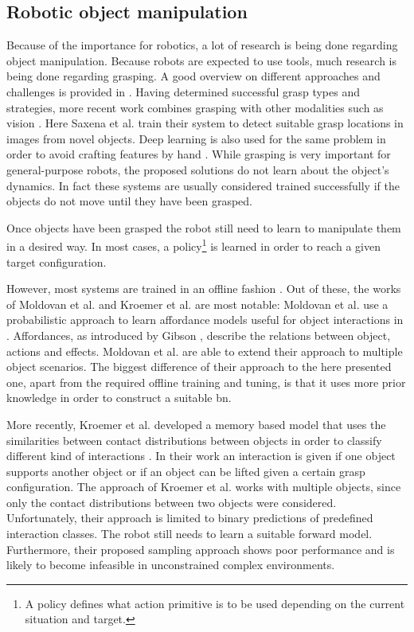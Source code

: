 \subsection{Robotic object manipulation}

Because of the importance for robotics, a lot of research is being done regarding object manipulation. Because robots are expected to use tools, much research is being done regarding grasping. A good overview on different approaches and challenges is provided in \cite{graspingReview}. Having determined successful grasp types and strategies, more recent work combines grasping with other modalities such as vision \cite{graspingVision}. Here Saxena et al. train their system to detect suitable grasp locations in images from novel objects.
Deep learning is also used for the same problem in order to avoid crafting features by hand \cite{graspingDeep}. 
While grasping is very important for general-purpose robots, the proposed solutions do not learn about the object's dynamics. In fact these systems are usually considered trained successfully if the objects do not move until they have been grasped.

Once objects have been grasped the robot still need to learn to manipulate them in a desired way. In most cases, a policy\footnote{A policy defines what action primitive is to be used depending on the current situation and target.} is learned in order to reach a given target configuration. 

However, most systems are trained in an offline fashion \cite{nishide2008predicting, moldovan2012learning, contactPrediction}. Out of these, the works of Moldovan et al. and Kroemer et al. are most notable:
Moldovan et al. use a probabilistic approach to learn affordance models useful for object interactions in \cite{moldovan2012learning}. Affordances, as introduced by Gibson \cite{affordances}, describe the relations between object, actions and effects. Moldovan et al. are able to extend their approach to multiple object scenarios. The biggest difference of their approach to the here presented one, apart from the required offline training and tuning, is that it uses more prior knowledge in order to construct a suitable \gls{bn}.

More recently, Kroemer et al. developed a memory based model that uses the similarities between contact distributions between objects in order to classify different kind of interactions \cite{contactPrediction}. In their work an interaction is given if one object supports another object or if an object can be lifted given a certain grasp configuration. The approach of Kroemer et al. works with multiple objects, since only the contact distributions between two objects were considered. Unfortunately, their approach is limited to binary predictions of predefined interaction classes. The robot still needs to learn a suitable forward model. Furthermore, their proposed sampling approach shows poor performance and is likely to become infeasible in unconstrained complex environments.

